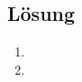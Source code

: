 \documentclass{exercise}
\begin{document}
    \subsection*{Lösung}
    \begin{enumerate}
        \item
        \item
    \end{enumerate}
\end{document}
